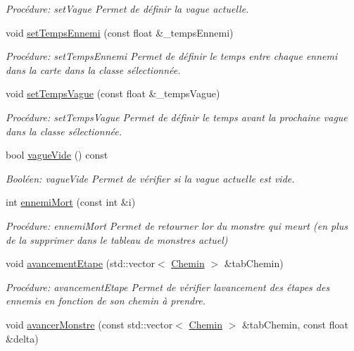 \begin{DoxyCompactItemize}
\begin{DoxyCompactList}\small\item\em Procédure\+: set\+Vague Permet de définir la vague actuelle. \end{DoxyCompactList}\item 
void \hyperlink{classVague_ae9e45cad0c4a4da804f749e03952545c}{set\+Temps\+Ennemi} (const float \&\+\_\+temps\+Ennemi)
\begin{DoxyCompactList}\small\item\em Procédure\+: set\+Temps\+Ennemi Permet de définir le temps entre chaque ennemi dans la carte dans la classe sélectionnée. \end{DoxyCompactList}\item 
void \hyperlink{classVague_a3c9775c8351b1581afba79c0fd87171a}{set\+Temps\+Vague} (const float \&\+\_\+temps\+Vague)
\begin{DoxyCompactList}\small\item\em Procédure\+: set\+Temps\+Vague Permet de définir le temps avant la prochaine vague dans la classe sélectionnée. \end{DoxyCompactList}\item 
bool \hyperlink{classVague_aaa31d3deb82c73be899c478a55a6724f}{vague\+Vide} () const
\begin{DoxyCompactList}\small\item\em Booléen\+: vague\+Vide Permet de vérifier si la vague actuelle est vide. \end{DoxyCompactList}\item 
int \hyperlink{classVague_ad732fb032c4b02416946736b1e25dcc8}{ennemi\+Mort} (const int \&i)
\begin{DoxyCompactList}\small\item\em Procédure\+: ennemi\+Mort Permet de retourner l\textquotesingle{}or du monstre qui meurt (en plus de la supprimer dans le tableau de monstres actuel) \end{DoxyCompactList}\item 
void \hyperlink{classVague_ab61cff7242c22ec90c6cb4858b5a0bc6}{avancement\+Etape} (std\+::vector$<$ \hyperlink{classChemin}{Chemin} $>$ \&tab\+Chemin)
\begin{DoxyCompactList}\small\item\em Procédure\+: avancement\+Etape Permet de vérifier l\textquotesingle{}avancement des étapes des ennemis en fonction de son chemin à prendre. \end{DoxyCompactList}\item 
void \hyperlink{classVague_a4753f9895677bc4050fdf0c8fc90984b}{avancer\+Monstre} (const std\+::vector$<$ \hyperlink{classChemin}{Chemin} $>$ \&tab\+Chemin, const float \&delta)

\end{DoxyCompactItemize}
